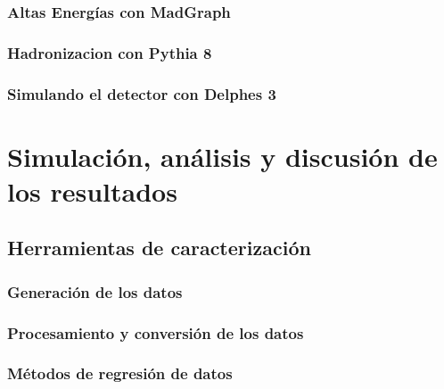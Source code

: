 \documentclass[12pt]{report}
\begin{document}
		\subsection{Altas Energías con MadGraph}\label{C_madgraph}
		

		\subsection{Hadronizacion con Pythia 8}\label{C_pythia8}
		

		\subsection{Simulando el detector con Delphes 3}\label{C_delphes}
		


\chapter{Simulación, análisis y discusión de los resultados}


    \section{Herramientas de caracterización}
    
    
        \subsection{Generación de los datos}\label{Cap_genera}
        
        
        \subsection{Procesamiento y conversión de los datos}
        
        
        \subsection{Métodos de regresión de datos}
        \label{Cap_regresion}
    
\end{document}
